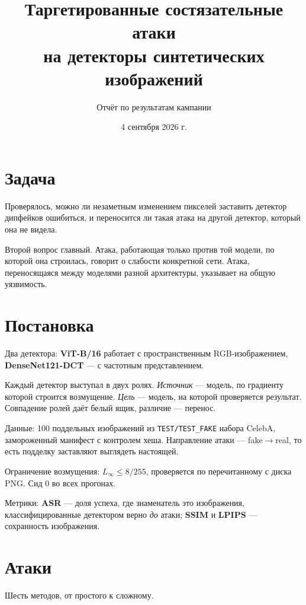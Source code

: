 \documentclass[11pt,a4paper]{article}
\title{Таргетированные состязательные атаки\\на детекторы синтетических изображений}
\author{Отчёт по результатам кампании}
\date{4 сентября 2026 г.}
\begin{document}
\maketitle

\section{Задача}

Проверялось, можно ли незаметным изменением пикселей заставить детектор
дипфейков ошибиться, и переносится ли такая атака на другой детектор, который
она не видела.

Второй вопрос главный. Атака, работающая только против той модели, по которой
она строилась, говорит о слабости конкретной сети. Атака, переносящаяся между
моделями разной архитектуры, указывает на общую уязвимость.

\section{Постановка}

Два детектора: \textbf{ViT-B/16} работает с пространственным RGB-изображением,
\textbf{DenseNet121-DCT} — с частотным представлением.

Каждый детектор выступал в двух ролях. \emph{Источник} — модель, по градиенту
которой строится возмущение. \emph{Цель} — модель, на которой проверяется
результат. Совпадение ролей даёт белый ящик, различие — перенос.

Данные: 100 поддельных изображений из \texttt{TEST/TEST\_FAKE} набора CelebA,
замороженный манифест с контролем хеша. Направление атаки — fake${\to}$real,
то есть подделку заставляют выглядеть настоящей.

Ограничение возмущения: $L_\infty \le 8/255$, проверяется по перечитанному с
диска PNG. Сид 0 во всех прогонах.

Метрики: \textbf{ASR} — доля успеха, где знаменатель это изображения,
классифицированные детектором верно \emph{до} атаки; \textbf{SSIM} и
\textbf{LPIPS} — сохранность изображения.

\section{Атаки}

Шесть методов, от простого к сложному.
\end{document}
